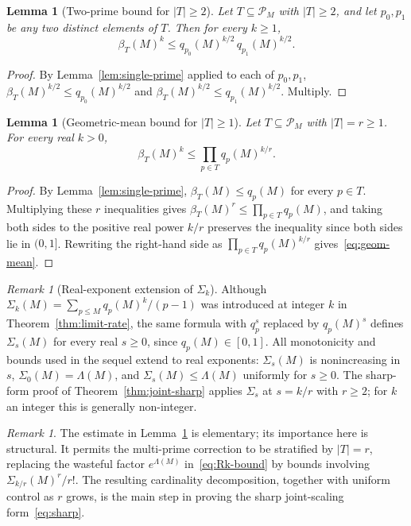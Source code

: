\documentclass[11pt]{article}
\newtheorem{lemma}[theorem]{Lemma}
\theoremstyle{remark}
\newtheorem{remark}[theorem]{Remark}
\newcommand{\PM}{\mathcal{P}_M}
\begin{document}
\begin{lemma}[Two-prime bound for $|T| \geq 2$]\label{lem:two-prime}
Let $T \subseteq \PM$ with $|T| \geq 2$, and let $p_0, p_1$ be any two distinct elements of $T$. Then for every $k \geq 1$,
\[
\beta_T(M)^k \leq q_{p_0}(M)^{k/2}\, q_{p_1}(M)^{k/2}.
\]
\end{lemma}
\begin{proof}
By Lemma~\ref{lem:single-prime} applied to each of $p_0, p_1$, $\beta_T(M)^{k/2} \leq q_{p_0}(M)^{k/2}$ and $\beta_T(M)^{k/2} \leq q_{p_1}(M)^{k/2}$. Multiply.
\end{proof}

\begin{lemma}[Geometric-mean bound for $|T| \geq 1$]\label{lem:geom-mean}
Let $T \subseteq \PM$ with $|T| = r \geq 1$. For every real $k > 0$,
\begin{equation}\label{eq:geom-mean}
\beta_T(M)^k \leq \prod_{p \in T} q_p(M)^{k/r}.
\end{equation}
\end{lemma}
\begin{proof}
By Lemma~\ref{lem:single-prime}, $\beta_T(M) \leq q_p(M)$ for every $p \in T$. Multiplying these $r$ inequalities gives $\beta_T(M)^r \leq \prod_{p \in T} q_p(M)$, and taking both sides to the positive real power $k/r$ preserves the inequality since both sides lie in $(0, 1]$. Rewriting the right-hand side as $\prod_{p \in T} q_p(M)^{k/r}$ gives~\eqref{eq:geom-mean}.
\end{proof}

\begin{remark}[Real-exponent extension of $\Sigma_k$]\label{rem:sigma-real}
Although $\Sigma_k(M) = \sum_{p \leq M} q_p(M)^k/(p-1)$ was introduced at integer $k$ in Theorem~\ref{thm:limit-rate}, the same formula with $q_p^s$ replaced by $q_p(M)^s$ defines $\Sigma_s(M)$ for every real $s \geq 0$, since $q_p(M) \in [0, 1]$. All monotonicity and bounds used in the sequel extend to real exponents: $\Sigma_s(M)$ is nonincreasing in $s$, $\Sigma_0(M) = \Lambda(M)$, and $\Sigma_s(M) \leq \Lambda(M)$ uniformly for $s \geq 0$. The sharp-form proof of Theorem~\ref{thm:joint-sharp} applies $\Sigma_s$ at $s = k/r$ with $r \geq 2$; for $k$ an integer this is generally non-integer.
\end{remark}

\begin{remark}\label{rem:why-geom-mean}
The estimate in Lemma~\ref{lem:geom-mean} is elementary; its importance here is structural. It permits the multi-prime correction to be stratified by $|T|=r$, replacing the wasteful factor $e^{\Lambda(M)}$ in~\eqref{eq:Rk-bound} by bounds involving $\Sigma_{k/r}(M)^r/r!$. The resulting cardinality decomposition, together with uniform control as $r$ grows, is the main step in proving the sharp joint-scaling form~\eqref{eq:sharp}.
\end{remark}
\end{document}
